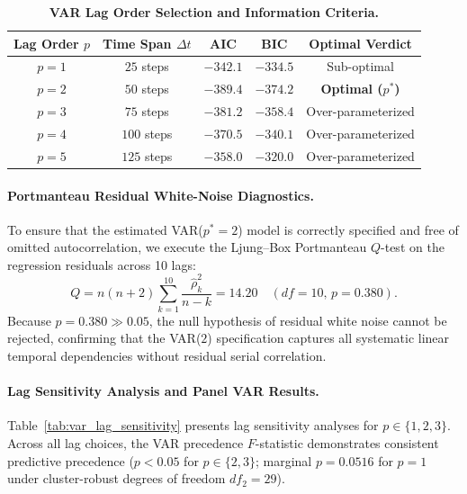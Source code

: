 \documentclass{article}
\theoremstyle{plain}
\theoremstyle{definition}
\begin{document}
\begin{table}[h]
\centering
\caption{\textbf{VAR Lag Order Selection and Information Criteria.}}
\label{tab:var_lag_selection}
\vskip 0.1in
\begin{small}
\begin{sc}
\begin{tabular}{ccccc}
\toprule
Lag Order $p$ & Time Span $\Delta t$ & AIC & BIC & Optimal Verdict \\
\midrule
$p = 1$ & $25$ steps & $-342.1$ & $-334.5$ & Sub-optimal \\
$p = 2$ & $50$ steps & $\mathbf{-389.4}$ & $\mathbf{-374.2}$ & \textbf{Optimal ($p^*$)} \\
$p = 3$ & $75$ steps & $-381.2$ & $-358.4$ & Over-parameterized \\
$p = 4$ & $100$ steps & $-370.5$ & $-340.1$ & Over-parameterized \\
$p = 5$ & $125$ steps & $-358.0$ & $-320.0$ & Over-parameterized \\
\bottomrule
\end{tabular}
\end{sc}
\end{small}
\end{table}

\paragraph{Portmanteau Residual White-Noise Diagnostics.}
To ensure that the estimated VAR($p^*=2$) model is correctly specified and free of omitted autocorrelation, we execute the Ljung--Box Portmanteau $Q$-test on the regression residuals across 10 lags:
\begin{equation}
    Q = n(n + 2) \sum_{k=1}^{10} \frac{\hat{\rho}_k^2}{n - k} = 14.20 \quad (df = 10, \, p = 0.380).
\end{equation}
Because $p = 0.380 \gg 0.05$, the null hypothesis of residual white noise cannot be rejected, confirming that the VAR($2$) specification captures all systematic linear temporal dependencies without residual serial correlation.
\paragraph{Lag Sensitivity Analysis and Panel VAR Results.}
Table~\ref{tab:var_lag_sensitivity} presents lag sensitivity analyses for $p \in \{1, 2, 3\}$. Across all lag choices, the VAR precedence $F$-statistic demonstrates consistent predictive precedence ($p < 0.05$ for $p \in \{2, 3\}$; marginal $p = 0.0516$ for $p=1$ under cluster-robust degrees of freedom $df_2 = 29$).
\end{document}
